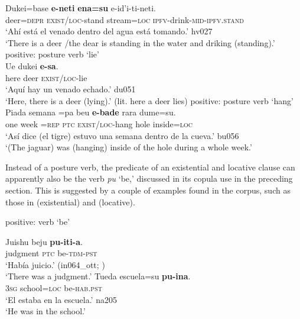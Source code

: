 \documentclass[output=paper]{langsci/langscibook}
\begin{document}
\begin{exe}
\gll {}Dukei=base \textbf{e-neti}
\textbf{ena=su} e-id'i-ti-neti.\\
    deer=\textsc{depr}  \textsc{exist/loc}-stand  stream=\textsc{loc}
    \textsc{ipfv}-drink-\textsc{mid-ipfv.stand}\\
\glt `Ahí está el venado dentro del agua está tomando.' hv027\\
`There is a deer \slash  the dear is standing in the water and driking (standing).'
\ex\label{ex:tacana-posture-lie}  positive: posture verb `lie'\\
\gll
    Ue dukei \textbf{e-sa}.\\
    here  deer  \textsc{exist/loc}-lie\\
\glt `Aquí hay un venado echado.' du051\\
`Here, there is a deer (lying).' (lit. here a deer lies)
\ex\label{ex:tacana-posture-hang}  positive: posture verb `hang'\\
\gll
  {\ob}Piada semana{\cb} =pa beu \textbf{e-bade}
  rara dume=su{\cb}.\\
  one  week  =\textsc{rep}  \textsc{ptc}  \textsc{exist/loc}-hang  hole
  inside\textsc{=loc}\\
\glt `Así dice (el tigre) estuvo una semana dentro de la cueva.' bu056\\
`(The jaguar) was (hanging) inside of the hole during a whole week.'
\end{exe}
%
Instead of a posture verb, the predicate of an existential and locative
clause can apparently also be the verb \textit{pu} `be,' discussed in its
copula use in the preceding section. This is suggested by a couple of
examples found in the corpus, such as those in
 (existential) and  (locative). 
%
\begin{exe}\ex
\label{ex:tacana-be-judgement-school}  positive: verb `be' 
\begin{xlist}
\ex\label{ex:tacana-be-judgement}
\gll {}Juishu  beju
\textbf{pu-iti-a}.\\
    judgment  \textsc{ptc}  be-\textsc{tdm-pst}\\
\glt `Había juicio.' (in064\_ott; \citealt[62]{Ottaviano1980})\\
`There was a judgment.'
\ex\label{ex:tacana-be-school}
\gll  {}Tueda
escuela=su
\textbf{pu-ina}.\\
    \textsc{3sg}  school=\textsc{loc}  be-\textsc{hab.pst}\\
\glt `El estaba en la escuela.' na205\\
`He was in the school.'
\end{xlist}\end{exe}
\end{document}
